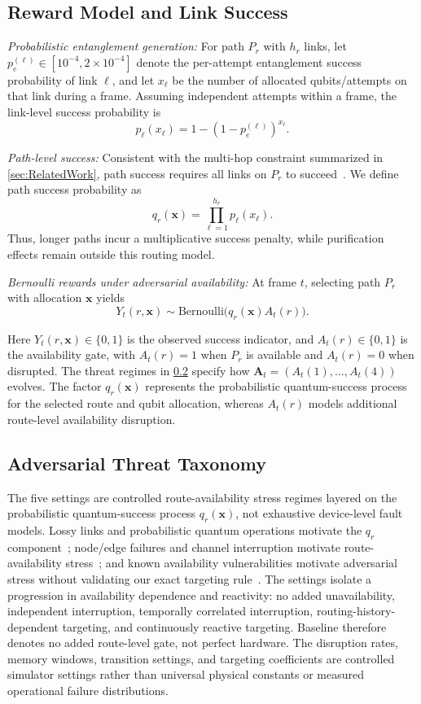 \documentclass[10pt,journal]{IEEEtran}
\newcommand{\smallTitle}[1]{\vspace{1mm}\noindent\textit{#1:}}
\begin{document}
\subsection{Reward Model and Link Success}
\label{subsec:reward}

\smallTitle{Probabilistic entanglement generation}
For path $P_r$ with $h_r$ links, let $p_e^{(\ell)}\in[10^{-4},2{\times}10^{-4}]$ denote the per-attempt entanglement success probability of link $\ell$, and let $x_\ell$ be the number of allocated qubits/attempts on that link during a frame. Assuming independent attempts within a frame, the link-level success probability is
\[
p_\ell(x_\ell)=1-(1-p_e^{(\ell)})^{x_\ell}.
\]

\smallTitle{Path-level success}
Consistent with the multi-hop constraint summarized in \cref{sec:RelatedWork}, path success requires all links on $P_r$ to succeed~\cite{briegel1998quantum,zukowski1993event}. We define path success probability as
\[q_r(\mathbf{x})=\prod_{\ell=1}^{h_r}p_\ell(x_\ell).\]
Thus, longer paths incur a multiplicative success penalty, while purification effects remain outside this routing model.

\smallTitle{Bernoulli rewards under adversarial availability}
At frame $t$, selecting path $P_r$ with allocation $\mathbf{x}$ yields
\[Y_t(r,\mathbf{x})\sim\mathrm{Bernoulli}\!\big(q_r(\mathbf{x})A_t(r)\big).\]

Here $Y_t(r,\mathbf{x})\in\{0,1\}$ is the observed success indicator, and $A_t(r)\in\{0,1\}$ is the availability gate, with $A_t(r)=1$ when $P_r$ is available and $A_t(r)=0$ when disrupted. The threat regimes in \cref{subsec:threats} specify how $\mathbf{A}_t=(A_t(1),\ldots,A_t(4))$ evolves.
The factor $q_r(\mathbf{x})$ represents the probabilistic quantum-success process for the selected route and qubit allocation, whereas $A_t(r)$ models additional route-level availability disruption.

\subsection{Adversarial Threat Taxonomy}
\label{subsec:threats}
The five settings are controlled route-availability stress regimes layered on the probabilistic quantum-success process $q_r(\mathbf{x})$, not exhaustive device-level fault models. Lossy links and probabilistic quantum operations motivate the $q_r$ component~\cite{pant2019routing}; node/edge failures and channel interruption motivate route-availability stress~\cite{li2021effective}; and known availability vulnerabilities motivate adversarial stress without validating our exact targeting rule~\cite{satoh2020attacking}. The settings isolate a progression in availability dependence and reactivity: no added unavailability, independent interruption, temporally correlated interruption, routing-history-dependent targeting, and continuously reactive targeting. Baseline therefore denotes no added route-level gate, not perfect hardware. The disruption rates, memory windows, transition settings, and targeting coefficients are controlled simulator settings rather than universal physical constants or measured operational failure distributions.
\end{document}
